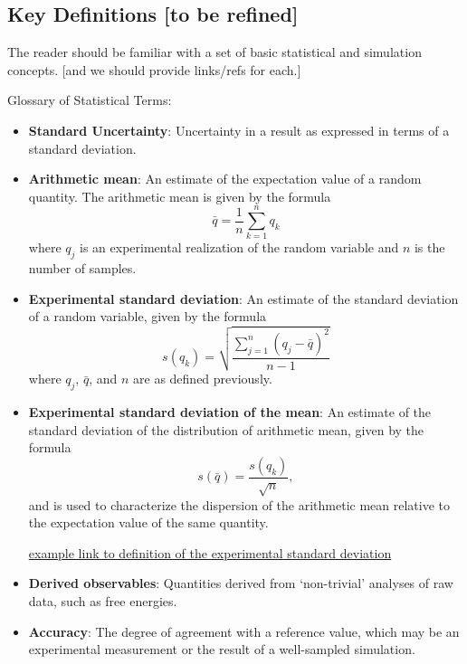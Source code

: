 \subsection{Key Definitions [to be refined]}
The reader should be familiar with a set of basic statistical and simulation concepts.
[and we should provide links/refs for each.]

\cite{JCGM:GUM2008,JCGM:VIM2012}

Glossary of Statistical Terms:
\begin{itemize}
\item {\bf Standard Uncertainty}: Uncertainty in a result as expressed in terms of a standard deviation.

\item {\bf Arithmetic mean}: An estimate of the expectation value of a random quantity. The arithmetic mean is given by the formula
  \begin{equation}
    \bar{q} = \dfrac{1}{n} \sum_{k=1}^{n} q_k
  \end{equation}
  where $q_j$ is an experimental realization of the random variable and $n$ is the number of samples. \label{def:arith_mean}
\item {\bf Experimental standard deviation}: An estimate of the standard deviation of a random variable, given by the formula
  \begin{equation}
    s\left(q_k\right) = \sqrt{\dfrac{\sum_{j=1}^n\left(q_j - \bar{q}\right)^2}{n-1}}
  \end{equation}
  where $q_j$, $\bar{q}$, and $n$ are as defined previously. \label{def:exp_st_dev}
\item {\bf Experimental standard deviation of the mean}: An estimate of the standard deviation of the distribution of arithmetic mean, given by the formula
  \begin{equation}
    s\left(\bar{q}\right) = \dfrac{s\left(q_k\right)}{\sqrt{n}},
  \end{equation}
  and is used to characterize the dispersion of the arithmetic mean relative to the expectation value of the same quantity. \label{def:exp_st_dev_mean}


  \hyperref[def:exp_st_dev]{example link to definition of the experimental standard deviation}
  
\item {\bf Derived observables}: Quantities derived from `non-trivial' analyses of raw data, such as free energies.

\item {\bf Accuracy}: The degree of agreement with a reference value, which may be an experimental measurement or the result of a well-sampled simulation.


\end{itemize}
